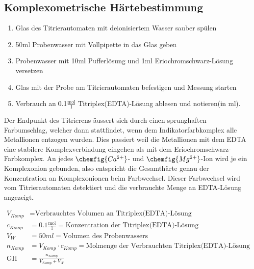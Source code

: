 \subsection{Komplexometrische Härtebestimmung}
\begin{addmargin}[3cm]{0cm}
	\begin{enumerate}
		\item Glas des Titrierautomaten mit deionisiertem Wasser sauber spülen
	
		\item 50ml Probenwasser mit Vollpipette in das Glas geben
		
		\item Probenwasser mit 10ml Pufferlösung und 1ml Eriochromschwarz-Lösung versetzen
		
		\item Glas mit der Probe am Titrierautomaten befestigen und Messung starten
		
		\item Verbrauch an 0.1$\frac{\mathrm{mol}}{\mathrm{l}}$ Titriplex(EDTA)-Lösung ablesen und notieren(in ml).
	\end{enumerate}
	\vspace{0.5cm}
	Der Endpunkt des Titrierens äussert sich durch einen sprunghaften Farbumschlag, welcher dann stattfindet, wenn dem Indikatorfarbkomplex alle Metallionen entzogen wurden. Dies passiert weil die Metallionen mit dem EDTA eine stabilere Komplexverbindung eingehen als mit dem Eriochromschwarz-Farbkomplex. An jedes $\chemfig{Ca^{2+}}$- und $\chemfig{Mg^{2+}}$-Ion wird je ein Komplexonion gebunden, also entspricht die Gesamthärte genau der Konzentration an Komplexonionen beim Farbwechsel. Dieser Farbwechsel wird vom Titrierautomaten detektiert und die verbrauchte Menge an EDTA-Lösung angezeigt.
	
	\vspace{0.5cm}
	
	$\boxed
	{
		\begin{aligned}
			V_{Komp} &= \text{Verbrauchtes Volumen an Titriplex(EDTA)-Lösung} \\
			c_{Komp} &= 0.1 \frac{\mathrm{mol}}{\mathrm{l}}= \text{Konzentration der Titriplex(EDTA)-Lösung} \\
			V_{W} &= 50ml = \text{Volumen des Probenwassers} \\
			n_{Komp} &= V_{Komp}\cdot c_{Komp} =\text{Molmenge der Verbrauchten Titriplex(EDTA)-Lösung} \\
			\mathrm{GH} &=   \frac{n_{Komp}}{V_{Komp}+V_{W}} 
		\end{aligned}
	}$
	
	\vspace{0.5cm}
\end{addmargin}

